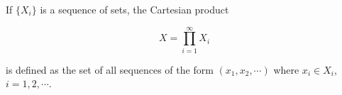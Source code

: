 If $\{X_i\}$ is a sequence of sets, the Cartesian product

$$X = \prod_{i=1}^{\infty} X_i$$

is defined as the set of all sequences of the form $(x_1, x_2, \cdots)$ where $x_i \in X_i$, $i = 1, 2, \cdots$.
